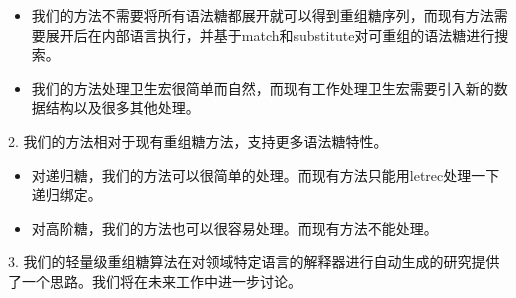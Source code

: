 \begin{itemize}
	\item 我们的方法不需要将所有语法糖都展开就可以得到重组糖序列，而现有方法需要展开后在内部语言执行，并基于match和substitute对可重组的语法糖进行搜索。
	\item 我们的方法处理卫生宏很简单而自然，而现有工作处理卫生宏需要引入新的数据结构以及很多其他处理。
\end{itemize}
\begin{flushleft}
	2.	我们的方法相对于现有重组糖方法，支持更多语法糖特性。
\end{flushleft}

\begin{itemize}
	\item 对递归糖，我们的方法可以很简单的处理。而现有方法只能用letrec处理一下递归绑定。
	\item 对高阶糖，我们的方法也可以很容易处理。而现有方法不能处理。
\end{itemize}
\begin{flushleft}
	3.	我们的轻量级重组糖算法在对领域特定语言的解释器进行自动生成的研究提供了一个思路。我们将在未来工作中进一步讨论。
\end{flushleft}



